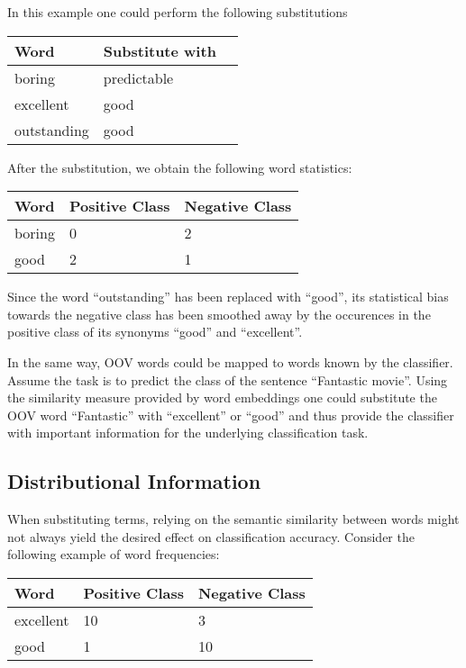 In this example one could perform the following substitutions

\begin{center}
\begin{tabular}{l|l|l}
\textbf{Word} & \textbf{Substitute with}  \\
\hline
boring & predictable \\
excellent & good \\
outstanding & good \\
\end{tabular}
\end{center}

After the substitution, we obtain the following word statistics:

\begin{center}
\begin{tabular}{l|l|l}
\textbf{Word} & \textbf{Positive Class} & \textbf{Negative Class}  \\
\hline
boring & 0 & 2 \\
good & 2 & 1 \\
\end{tabular}
\end{center}

Since the word ``outstanding'' has been replaced with ``good'', its
statistical bias towards the negative class has been smoothed away by the
occurences in the positive class of its synonyms ``good'' and ``excellent''.
 
In the same way, OOV words could be mapped to words known by the
classifier. Assume the task is to predict the class of the sentence ``Fantastic movie''. 
Using the similarity measure provided by word embeddings one could substitute
the OOV word ``Fantastic'' with ``excellent'' or ``good'' and thus provide the
classifier with important information for the underlying classification task.

\subsection{Distributional Information}
When substituting terms, relying on the semantic similarity between
words might not always yield the desired effect on classification
accuracy. Consider the following example of word frequencies:

\begin{center}
\begin{tabular}{l|l|l}
\textbf{Word} & \textbf{Positive Class} & \textbf{Negative Class}  \\
\hline
excellent & 10 & 3 \\
good & 1 & 10 \\
\end{tabular}
\end{center}


